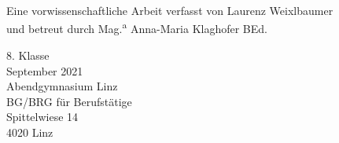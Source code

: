 \begin{titlepage}
    \centering%

    \setlength{\parindent}{0pt}%

    {\chapter*{\centering\huge\textbf{\\}}}%

    {\large Eine vorwissenschaftliche Arbeit verfasst von Laurenz Weixlbaumer\\
    und betreut durch Mag.\textsuperscript{a} Anna-Maria Klaghofer BEd.}

    \vfill
    8. Klasse\\
    September 2021\\\vspace{0.5cm}
    Abendgymnasium Linz\\
    BG/BRG für Berufstätige\\
    Spittelwiese 14\\
    4020 Linz
    
    
    \thispagestyle{empty}
\end{titlepage}

\clearpage\addtocounter{page}{1}

